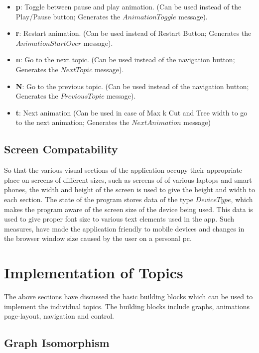 \begin{itemize}
\item \textbf{p}: Toggle between pause and play animation. (Can be used instead of the Play/Pause button; Generates the $AnimationToggle$ message). \\
\item \textbf{r}: Restart animation. (Can be used instead of Restart Button; Generates the $AnimationStartOver$ message). \\
\item \textbf{n}: Go to the next topic. (Can be used instead of the navigation button; Generates the $NextTopic$ message). \\
\item \textbf{N}: Go to the previous topic. (Can be used instead of the navigation button; Generates the $PreviousTopic$ message). \\
\item \textbf{t}: Next animation (Can be used in case of Max k Cut and Tree width to go to the next animation; Generates the $NextAnimation$ message)
\end{itemize}


\subsection{Screen Compatability}
So that the various visual sections of the application occupy their appropriate
place on screens of different sizes, such as screens of of various laptops and
smart phones, the width and height of the screen is used to give the height and
width to each section.  
The state of the program stores data of the type $DeviceType$, which makes the
program aware of the screen size of the device being used. This data is used to
give proper font size to various text elements used in the app. Such measures,
have made the application friendly to mobile devices and changes in the browser
window size caused by the user on a personal pc.

\section{Implementation of Topics}
The above sections have discussed the basic building blocks which can be used
to implement the individual topics. The building blocks include graphs, animations
page-layout, navigation and control.

\subsection{Graph Isomorphism}
\label{impl: isomporphism}


